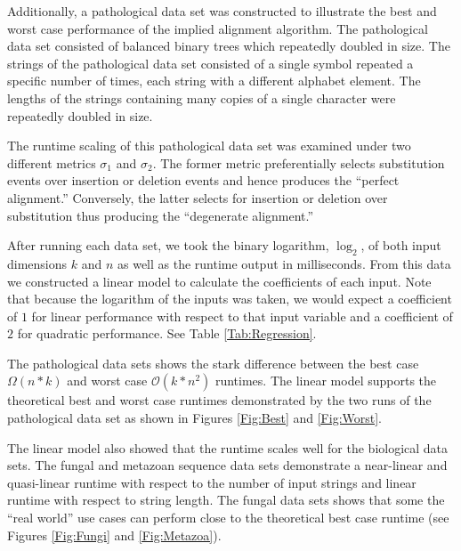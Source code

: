\documentclass[11pt]{article}
\begin{document}
Additionally, a pathological data set was constructed to illustrate the best and worst case performance of the implied alignment algorithm.
The pathological data set consisted of balanced binary trees which repeatedly doubled in size.
The strings of the pathological data set consisted of a single symbol repeated a specific number of times, each string with a different alphabet element.
The lengths of the strings containing many copies of a single character were repeatedly doubled in size.

The runtime scaling of this pathological data set was examined under two different metrics $\sigma_1$ and $\sigma_2$.
The former metric preferentially selects substitution events over insertion or deletion events and hence produces the ``perfect alignment.''
Conversely, the latter selects for insertion or deletion over substitution thus producing the ``degenerate alignment.''

After running each data set, we took the binary logarithm, $\log_{2}$, of both input dimensions $k$ and $n$ as well as the runtime output in milliseconds.
From this data we constructed a linear model to calculate the coefficients of each input.
Note that because the logarithm of the inputs was taken, we would expect a coefficient of $1$ for linear performance with respect to that input variable and a coefficient of $2$ for quadratic performance.
See Table \ref{Tab:Regression}.

The pathological data sets shows the stark difference between the best case $\Omega(n * k)$ and worst case $\mathcal{O}(k * n^2)$ runtimes.
The linear model supports the theoretical best and worst case runtimes demonstrated by the two runs of the pathological data set as shown in Figures \ref{Fig:Best} and \ref{Fig:Worst}. %

The linear model also showed that the runtime scales well for the biological data sets.
The fungal and metazoan sequence data sets demonstrate a near-linear and quasi-linear runtime with respect to the number of input strings and linear runtime with respect to string length.
The fungal data sets shows that some the ``real world'' use cases can  perform close to the theoretical best case runtime (see Figures \ref{Fig:Fungi} and \ref{Fig:Metazoa}). %
\end{document}
